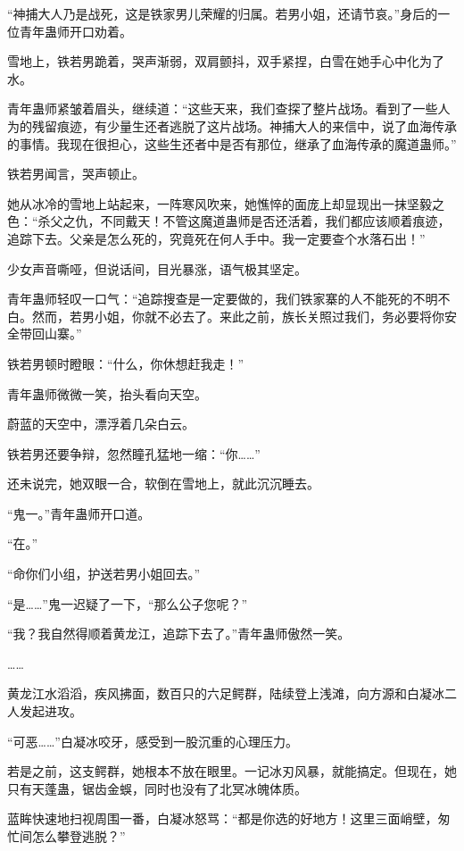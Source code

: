 
\begin{this_body}



“神捕大人乃是战死，这是铁家男儿荣耀的归属。若男小姐，还请节哀。”身后的一位青年蛊师开口劝着。

雪地上，铁若男跪着，哭声渐弱，双肩颤抖，双手紧捏，白雪在她手心中化为了水。

青年蛊师紧皱着眉头，继续道：“这些天来，我们查探了整片战场。看到了一些人为的残留痕迹，有少量生还者逃脱了这片战场。神捕大人的来信中，说了血海传承的事情。我现在很担心，这些生还者中是否有那位，继承了血海传承的魔道蛊师。”

铁若男闻言，哭声顿止。

她从冰冷的雪地上站起来，一阵寒风吹来，她憔悴的面庞上却显现出一抹坚毅之色：“杀父之仇，不同戴天！不管这魔道蛊师是否还活着，我们都应该顺着痕迹，追踪下去。父亲是怎么死的，究竟死在何人手中。我一定要查个水落石出！”

少女声音嘶哑，但说话间，目光暴涨，语气极其坚定。

青年蛊师轻叹一口气：“追踪搜查是一定要做的，我们铁家寨的人不能死的不明不白。然而，若男小姐，你就不必去了。来此之前，族长关照过我们，务必要将你安全带回山寨。”

铁若男顿时瞪眼：“什么，你休想赶我走！”

青年蛊师微微一笑，抬头看向天空。

蔚蓝的天空中，漂浮着几朵白云。

铁若男还要争辩，忽然瞳孔猛地一缩：“你……”

还未说完，她双眼一合，软倒在雪地上，就此沉沉睡去。

“鬼一。”青年蛊师开口道。

“在。”

“命你们小组，护送若男小姐回去。”

“是……”鬼一迟疑了一下，“那么公子您呢？”

“我？我自然得顺着黄龙江，追踪下去了。”青年蛊师傲然一笑。

……

黄龙江水滔滔，疾风拂面，数百只的六足鳄群，陆续登上浅滩，向方源和白凝冰二人发起进攻。

“可恶……”白凝冰咬牙，感受到一股沉重的心理压力。

若是之前，这支鳄群，她根本不放在眼里。一记冰刃风暴，就能搞定。但现在，她只有天蓬蛊，锯齿金蜈，同时也没有了北冥冰魄体质。

蓝眸快速地扫视周围一番，白凝冰怒骂：“都是你选的好地方！这里三面峭壁，匆忙间怎么攀登逃脱？”


\end{this_body}
